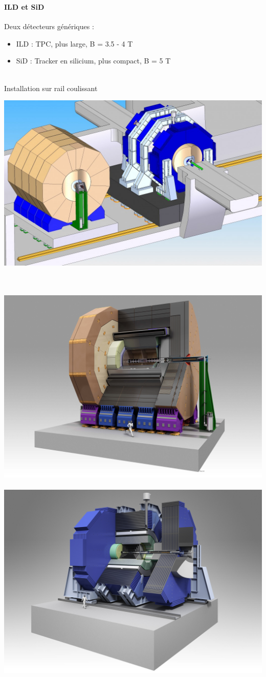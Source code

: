 \documentclass[8pt]{beamer}
\begin{document}
  \begin{frame}
  \frametitle{\secname}
  \framesubtitle{ILD et SiD}
    \begin{minipage}{0.54\linewidth}
      Deux détecteurs génériques :
      \begin{itemize}
        \item ILD : TPC, plus large, B = 3.5 - 4 T
        \item SiD : Tracker en silicium, plus compact, B = 5 T
      \end{itemize}
      ~ \\
      Installation sur rail coulissant
    \end{minipage}
    \begin{minipage}{0.45\linewidth}
      \begin{center}
        \includegraphics[width=0.94\linewidth]{ild_sid.jpg}
      \end{center}
    \end{minipage}
    ~ \\
    ~ \\
    \includegraphics[width=0.48\linewidth]{ild.jpg} ~~~~
    \includegraphics[width=0.48\linewidth]{sid.jpg}
  \end{frame}
\end{document}
